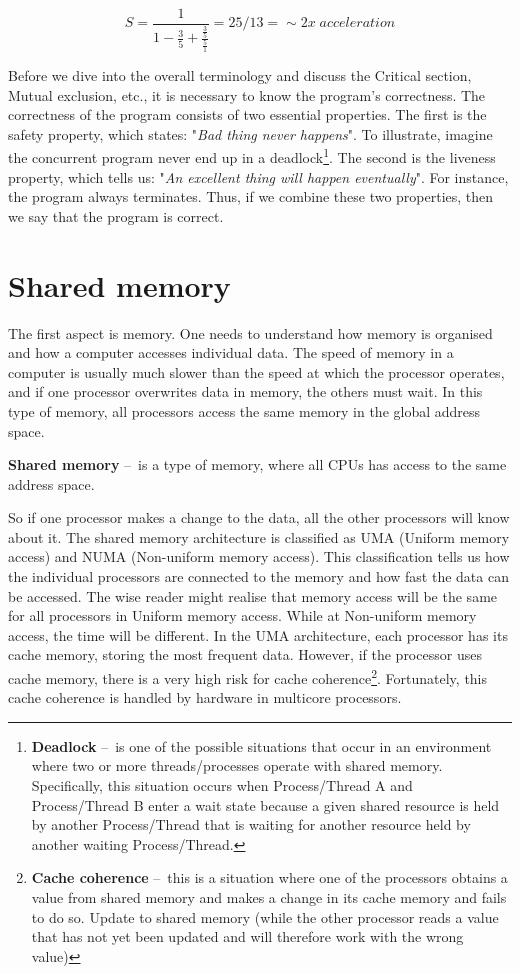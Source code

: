 \begin{equation}
    \label{eqn:amdalhinpractice}
    S = \frac{1}{1 - \frac{3}{5} + \frac{\frac{3}{5}}{\frac{5}{1}}} = 25/13 =\sim 2x \; acceleration
    \tag{2}
\end{equation}

Before we dive into the overall terminology and discuss the Critical section, Mutual exclusion, etc., it is necessary to know the program's correctness. The correctness of the program consists of two essential properties. The first is the safety property, which states: "\emph{Bad thing never happens}". To illustrate, imagine the concurrent program never end up in a deadlock\footnote{\textbf{Deadlock} \---\ is one of the possible situations that occur in an environment where two or more threads/processes operate with shared memory. Specifically, this situation occurs when Process/Thread A and Process/Thread B enter a wait state because a given shared resource is held by another Process/Thread that is waiting for another resource held by another waiting Process/Thread.}. The second is the liveness property, which tells us: "\emph{An excellent thing will happen eventually}". For instance, the program always terminates. Thus, if we combine these two properties, then we say that the program is correct.

\section{Shared memory}
\label{04:sharedmemory}

The first aspect is memory. One needs to understand how memory is organised and how a computer accesses individual data. The speed of memory in a computer is usually much slower than the speed at which the processor operates, and if one processor overwrites data in memory, the others must wait. In this type of memory, all processors access the same memory in the global address space.
\begin{definition}
    \textbf{Shared memory} \---\ is a type of memory, where all CPUs has access to the same address space.
\end{definition}
So if one processor makes a change to the data, all the other processors will know about it. The shared memory architecture is classified as UMA (Uniform memory access) and NUMA (Non-uniform memory access). This classification tells us how the individual processors are connected to the memory and how fast the data can be accessed. The wise reader might realise that memory access will be the same for all processors in Uniform memory access. While at Non-uniform memory access, the time will be different. In the UMA architecture, each processor has its cache memory, storing the most frequent data. However, if the processor uses cache memory, there is a very high risk for cache coherence\footnote {\textbf{Cache coherence} \---\ this is a situation where one of the processors obtains a value from shared memory and makes a change in its cache memory and fails to do so. Update to shared memory (while the other processor reads a value that has not yet been updated and will therefore work with the wrong value)}. Fortunately, this cache coherence is handled by hardware in multicore processors.

